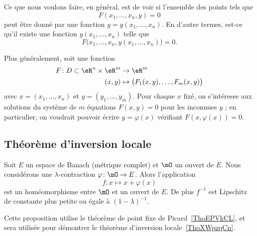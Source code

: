 Ce que nous voulons faire, en général, est de voir si l'ensemble des points tels que
\begin{equation}
    F(x_1,\ldots,x_n,y)=0
\end{equation}
peut être donné par une fonction $y=y(x_1,\ldots,x_n)$. En d'autre termes, est-ce qu'il existe une fonction $y(x_1,\ldots,x_n)$ telle que
\begin{equation}
    F\big( x_1,\ldots,x_n,y(x_1,\ldots,x_n)\big)=0.
\end{equation}

Plus généralement, soit une fonction
\begin{equation}
    \begin{aligned}
        F\colon D\subset \eR^n\times \eR^m&\to \eR^m \\
        (x,y)&\mapsto \big( F_1(x,y),\ldots, F_m(x,y) \big)
    \end{aligned}
\end{equation}
avec $x = (x_1,\ldots, x_n)$ et $y = (y_1,\ldots,y_m)$. Pour chaque $x$ fixé, on s'intéresse aux solutions du système de $m$ équations $F(x,y) = 0$ pour les inconnues $y$ ; en particulier, on voudrait pouvoir écrire $y = \varphi(x)$ vérifiant $F(x,\varphi(x)) = 0$.

\subsection{Théorème d'inversion locale}

\begin{lemma} \label{LemGZoqknC}
    Soit \( E\) un espace de Banach (métrique complet) et \( \mO\) un ouvert de \( E\). Nous considérons une \( \lambda\)-contraction \( \varphi\colon \mO\to E\). Alors l'application
    \begin{equation}
    f\colon x\mapsto x+\varphi(x)
    \end{equation}
    est un homéomorphisme entre \( \mO\) et un ouvert de \( E\). De plus \( f^{-1}\) est Lipschitz de constante plus petite ou égale à \( (1-\lambda)^{-1}\).
\end{lemma}
Cette proposition utilise le théorème de point fixe de Picard~\ref{ThoEPVkCL},
et sera utilisée pour démontrer le théorème d'inversion locale~\ref{ThoXWpzqCn}.

